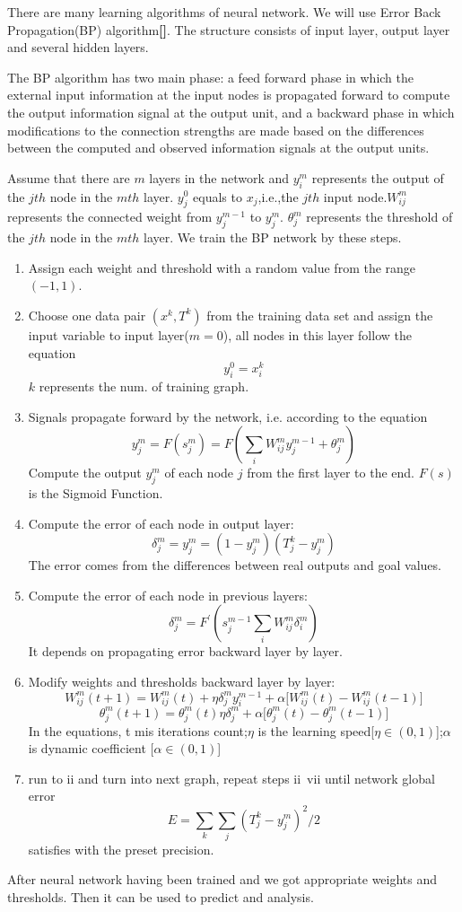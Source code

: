 \documentclass{mcmthesis}
\begin{document}
There are many learning algorithms of neural network. We will use Error Back Propagation(BP) algorithm\textbf{[]}. The structure consists of input layer, output layer and several hidden layers.

The BP algorithm has two main phase: a feed forward phase in which the external input information at the input nodes is propagated forward to compute the output information signal at the output unit, and a backward phase in which modifications to the connection strengths are made based on the differences between the computed and observed information signals at the output units. 

Assume that there are $m$ layers in the network and $y_{i}^{m}$ represents the output of the $jth$ node in the $mth$ layer. $y_{j}^{0}$ equals to $x_{j}$,i.e.,the $jth$ input node.$W_{ij}^{m}$ represents the connected weight from $y_{j}^{m-1}$ to $y_{j}^{m}$. $\theta_{j}^{m}$ represents the threshold of the $jth$ node in the $mth$ layer. We train the BP network by these steps.
\begin{enumerate}[i]
\item Assign each weight and threshold with a random value from the range $(-1,1)$.
\item Choose one data pair $(x^{k},T^{k})$ from the training data set and assign the input variable to input layer($m=0$), all nodes in this layer follow the equation$$y_{i}^{0}=x_{i}^{k} $$ $k$ represents the num. of training graph.
\item Signals propagate forward by the network, i.e. according to the equation$$y_{j}^{m}=F(s_{j}^{m})=F(\sum_{i} W_{ij}^{m}y_{j}^{m-1}+\theta_{j}^{m} )$$Compute the output $y_{j}^{m}$ of each node $j$ from the first layer to the end. $F(s)$ is the Sigmoid Function.
\item Compute the error of each node in output layer:$$\delta_{j}^{m}=y_{j}^{m}=(1-y_{j}^{m})(T_{j}^{k}-y_{j}^{m})$$ The error comes from the differences between real outputs and goal values.
\item Compute the error of each node in previous layers:$$\delta_{j}^{m}=F^{'}(s_{j}^{m-1}\sum_{i} W_{ij}^{m}\delta_{i}^{m})$$ It depends on propagating error backward layer by layer.
\item Modify weights and thresholds backward layer by layer:
$$W_{ij}^{m}(t+1)=W_{ij}^{m}(t)+\eta \delta_{j}^{m}y_{i}^{m-1}+\alpha \Big[W_{ij}^{m}(t)-W_{ij}^{m}(t-1) \Big]$$
$$\theta_{j}^{m}(t+1)=\theta_{j}^{m}(t)\eta\delta_{j}^{m}+\alpha\Big[\theta_{j}^{m}(t)-\theta_{j}^{m}(t-1) \Big]$$
In the equations, t mis iterations count;$\eta$ is the learning speed[$\eta \in (0,1)$];$\alpha$ is dynamic coefficient [$\alpha \in (0,1)$]
\item run to ii and turn into next graph, repeat steps ii~vii until network global error$$E=\sum_{k}\sum_{j}(T_{j}^{k}-y_{j}^{m})^{2}/2$$satisfies with the preset precision. 
\end{enumerate}
After neural network having been trained and we got appropriate weights and thresholds. Then it can be used to predict and analysis.
\end{document}
